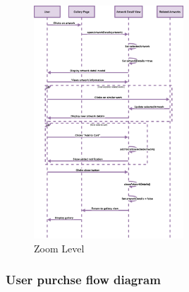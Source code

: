 \documentclass[]{project_final}
\begin{document}
\begin{figure}[ht!]
  \centering
  \includegraphics[width=0.5\textwidth]{AGSequenceDiagramViewingArtWork.png}
  \vspace*{0.0cm}
  \caption{Zoom Level}
  \label{fig:1}
\end{figure}
\newpage
\subsubsection{User purchse flow diagram}
\end{document}
